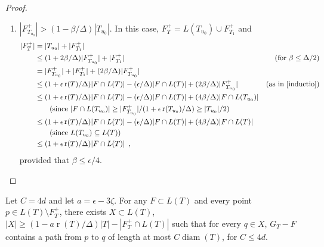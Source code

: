 \documentclass{patmorin}
\DeclareMathOperator{\rank}{r}
\DeclareMathOperator{\diam}{diam}
\begin{document}
\begin{proof}
\begin{enumerate}
\begin{enumerate}
       \item $|F^+_{T_{u_0}}| > (1-\beta/\Delta)|T_{u_0}|$. In this case, $F^+_T=L(T_{u_0}) \cup F^+_{T_1}$ and
       \begin{align*}
          |F^+_T| 
            & = |T_{u_0}| + |F^+_{T_1}| \\
            & \le (1+2\beta/\Delta)|F^+_{T_{u_0}}| + |F^+_{T_1}|
              & \text{(for $\beta\le \Delta/2$)}\\
            & = |F^+_{T_{u_0}}| + |F^+_{T_1}| + (2\beta/\Delta)|F^+_{T_{u_0}}| \\
            & \le (1+\epsilon\rank(T)/\Delta)|F\cap L(T)| - (\epsilon/\Delta)|F\cap L(T)| + (2\beta/\Delta)|F^+_{T_{u_0}}| 
             & \text{(as in \eqref{inductio})} \\
            & \le (1+\epsilon\rank(T)/\Delta)|F\cap L(T)| - (\epsilon/\Delta)|F\cap L(T)| + (4\beta/\Delta)|F\cap L(T_{u_0})|  \\
              & \qquad \text{(since $|F\cap L(T_{u_0})| \ge |F^+_{T_{u_0}}|/(1+\epsilon\rank(T_{u_0})/\Delta)\ge|T_{u_0}|/2$)}\\
            & \le (1+\epsilon\rank(T)/\Delta)|F\cap L(T)| - (\epsilon/\Delta)|F\cap L(T)| + (4\beta/\Delta)|F\cap L(T)| \\
              & \qquad \text{(since $L(T_{u_0})\subseteq L(T)$)} \\
            & \le (1+\epsilon\rank(T)/\Delta)|F\cap L(T)| \enspace ,
       \end{align*}
       provided that $\beta \le \epsilon/4$. \qedhere
     \end{enumerate}
   \end{enumerate}
\end{proof}


\begin{clm}
  Let $C=4d$ and let $a=\epsilon-3\zeta$.
  For any $F\subset L(T)$ and every point $p\in L(T)\setminus F^+_T$,
  there exists $X\subset L(T)$, $|X|\ge (1-a\rank(T)/\Delta)|T|-|F^+_T\cap
  L(T)|$ such that for every $q\in X$, $G_T-F$ contains a path from $p$
  to $q$ of length at most $C\diam(T)$, for $C\le 4d$.
\end{clm}
\end{document}
